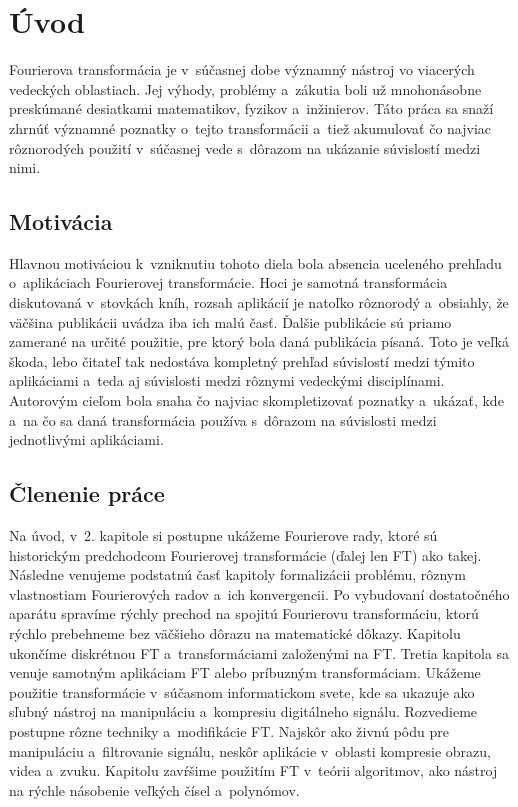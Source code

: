 \chapter{Úvod}

Fourierova transformácia je v~súčasnej dobe významný nástroj vo
viacerých vedeckých oblastiach. Jej výhody, problémy a~zákutia boli už
mnohonásobne preskúmané desiatkami matematikov, fyzikov a~inžinierov.
Táto práca sa snaží zhrnúť významné poznatky o~tejto transformácii 
a~tiež akumulovať čo najviac rôznorodých použití v~súčasnej vede
s~dôrazom na ukázanie súvislostí medzi nimi.

\section{Motivácia}
Hlavnou motiváciou k~vzniknutiu tohoto diela bola absencia uceleného
prehľadu o~aplikáciach Fourierovej transformácie. Hoci je samotná
transformácia diskutovaná v~stovkách kníh, rozsah aplikácií je natoľko
rôznorodý a~obsiahly, že väčšina publikácii uvádza iba ich malú časť.
Ďalšie publikácie sú priamo zamerané na určité použitie, pre ktorý bola daná
publikácia písaná. Toto je veľká škoda, lebo čitateľ tak nedostáva
kompletný prehľad súvislostí medzi týmito aplikáciami a~teda
aj súvislosti medzi rôznymi vedeckými disciplínami. Autorovým
cieľom bola snaha čo najviac skompletizovať poznatky a~ukázať, kde 
a~na čo sa daná transformácia používa s~dôrazom na súvislosti medzi
jednotlivými aplikáciami.

\section{Členenie práce}
Na úvod, v~2. kapitole si postupne ukážeme Fourierove rady, ktoré sú
historickým predchodcom Fourierovej transformácie (ďalej len FT) ako takej.
Následne
venujeme podstatnú časť kapitoly formalizácii problému, rôznym
vlastnostiam Fourierových radov a~ich konvergencii. Po vybudovaní
dostatočného aparátu spravíme rýchly prechod na spojitú Fourierovu
transformáciu, ktorú rýchlo prebehneme bez väčšieho dôrazu na
matematické dôkazy. Kapitolu ukončíme diskrétnou FT a~transformáciami
založenými na FT.
Tretia kapitola sa venuje samotným aplikáciam FT alebo príbuzným
transformáciam.  Ukážeme použitie %
transformácie v~súčasnom informatickom svete, kde sa ukazuje ako
sľubný nástroj na manipuláciu a~kompresiu digitálneho signálu.
Rozvedieme postupne rôzne techniky a~modifikácie FT. Najskôr ako
živnú pôdu pre manipuláciu a~filtrovanie signálu, neskôr aplikácie 
v~oblasti kompresie obrazu, videa a~zvuku. Kapitolu zavŕšime použitím
FT v~teórii algoritmov, ako nástroj na rýchle násobenie veľkých
čísel a~polynómov.
